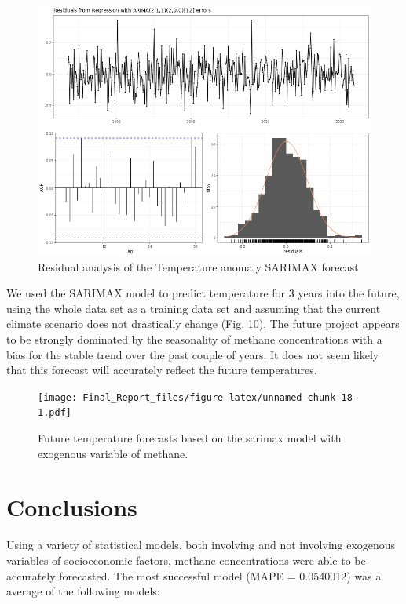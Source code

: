 \documentclass[
]{article}
\begin{document}
\begin{figure}

{\centering \includegraphics[width=0.8\linewidth]{./Forecasts/residuals_sarimax} 

}

\caption{Residual analysis of the Temperature anomaly SARIMAX forecast}\label{fig:unnamed-chunk-17}
\end{figure}

We used the SARIMAX model to predict temperature for 3 years into the
future, using the whole data set as a training data set and assuming
that the current climate scenario does not drastically change (Fig. 10).
The future project appears to be strongly dominated by the seasonality
of methane concentrations with a bias for the stable trend over the past
couple of years. It does not seem likely that this forecast will
accurately reflect the future temperatures.

\begin{figure}
\centering
\texttt{[image: Final\_Report\_files/figure-latex/unnamed-chunk-18-1.pdf]}
\caption{Future temperature forecasts based on the sarimax model with
exogenous variable of methane.}
\end{figure}

\section{Conclusions}\label{conclusions}

Using a variety of statistical models, both involving and not involving
exogenous variables of socioeconomic factors, methane concentrations
were able to be accurately forecasted. The most successful model (MAPE =
0.0540012) was a average of the following models:
\end{document}
